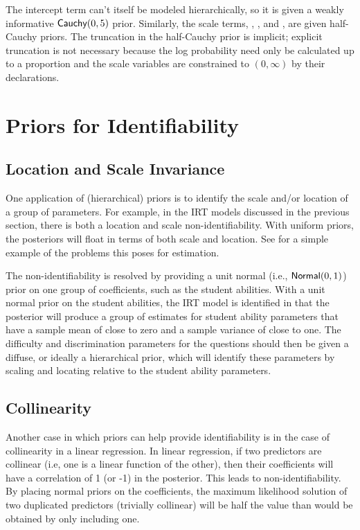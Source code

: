 The intercept term  can't itself be modeled
hierarchically, so it is given a weakly informative
$\distro{Cauchy}(0,5)$ prior.  Similarly, the scale terms,
, , and , are
given half-Cauchy priors.  The truncation in the half-Cauchy prior is
implicit; explicit truncation is not necessary because the log
probability need only be calculated up to a proportion and the scale
variables are constrained to $(0,\infty)$ by their declarations.



\section{Priors for Identifiability}\label{priors-for-identification.section}

\subsection{Location and Scale Invariance}

One application of (hierarchical) priors is to identify the scale
and/or location of a group of parameters. For example, in the IRT
models discussed in the previous section, there is both a location and
scale non-identifiability.  With uniform priors, the posteriors will
float in terms of both scale and location.  See
 for a simple example of the problems this
poses for estimation.

The non-identifiability is resolved by providing a unit normal (i.e.,
$\distro{Normal}(0,1)$) prior on one group of coefficients, such as
the student abilities.  With a unit normal prior on the student
abilities, the IRT model is identified in that the posterior will
produce a group of estimates for student ability parameters that have
a sample mean of close to zero and a sample variance of close to one.
The difficulty and discrimination parameters for the questions should
then be given a diffuse, or ideally a hierarchical prior, which will
identify these parameters by scaling and locating relative to the
student ability parameters.

\subsection{Collinearity}

Another case in which priors can help provide identifiability is in
the case of collinearity in a linear regression.  In linear
regression, if two predictors are collinear (i.e, one is a linear
function of the other), then their coefficients will have a
correlation of 1 (or -1) in the posterior.  This leads to
non-identifiability.  By placing normal priors on the coefficients,
the maximum likelihood solution of two duplicated predictors (trivially
collinear) will be half the value than would be obtained by only
including one.

